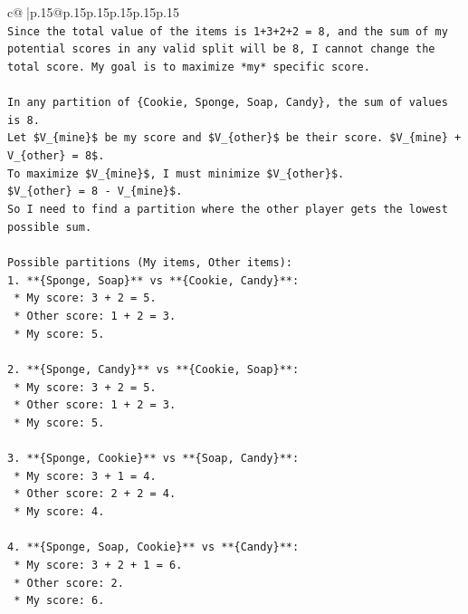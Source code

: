\documentclass{article}
\begin{document}
{\begin{supertabular}{c@{$\;$}|p{.15\linewidth}@{}p{.15\linewidth}p{.15\linewidth}p{.15\linewidth}p{.15\linewidth}p{.15\linewidth}}
{{{\\ 
\texttt{Since the total value of the items is 1+3+2+2 = 8, and the sum of my potential scores in any valid split will be 8, I cannot change the total score. My goal is to maximize *my* specific score.} \\
\\ 
\texttt{In any partition of \{Cookie, Sponge, Soap, Candy\}, the sum of values is 8.} \\
\texttt{Let \$V\_\{mine\}\$ be my score and \$V\_\{other\}\$ be their score. \$V\_\{mine\} + V\_\{other\} = 8\$.} \\
\texttt{To maximize \$V\_\{mine\}\$, I must minimize \$V\_\{other\}\$.} \\
\texttt{\$V\_\{other\} = 8 {-} V\_\{mine\}\$.} \\
\texttt{So I need to find a partition where the other player gets the lowest possible sum.} \\
\\ 
\texttt{Possible partitions (My items, Other items):} \\
\texttt{1.  **\{Sponge, Soap\}** vs **\{Cookie, Candy\}**:} \\
\texttt{    *   My score: 3 + 2 = 5.} \\
\texttt{    *   Other score: 1 + 2 = 3.} \\
\texttt{    *   My score: 5.} \\
\\ 
\texttt{2.  **\{Sponge, Candy\}** vs **\{Cookie, Soap\}**:} \\
\texttt{    *   My score: 3 + 2 = 5.} \\
\texttt{    *   Other score: 1 + 2 = 3.} \\
\texttt{    *   My score: 5.} \\
\\ 
\texttt{3.  **\{Sponge, Cookie\}** vs **\{Soap, Candy\}**:} \\
\texttt{    *   My score: 3 + 1 = 4.} \\
\texttt{    *   Other score: 2 + 2 = 4.} \\
\texttt{    *   My score: 4.} \\
\\ 
\texttt{4.  **\{Sponge, Soap, Cookie\}** vs **\{Candy\}**:} \\
\texttt{    *   My score: 3 + 2 + 1 = 6.} \\
\texttt{    *   Other score: 2.} \\
\texttt{    *   My score: 6.} \\
\\ 
}}}
\end{supertabular}}
\end{document}
